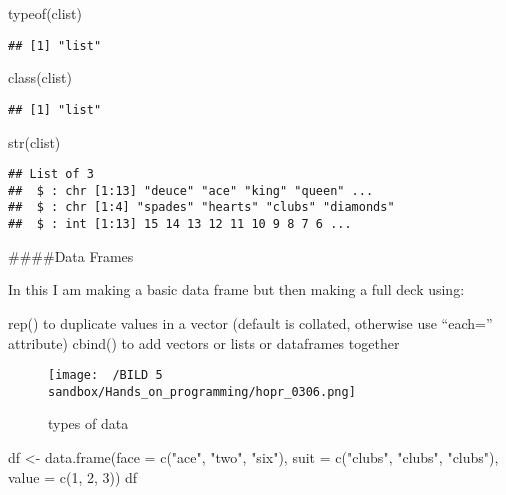 \documentclass[
]{article}
\newenvironment{Shaded}{\begin{snugshade}}{\end{snugshade}}
\newcommand{\AttributeTok}[1]{\textcolor[rgb]{0.77,0.63,0.00}{#1}}
\newcommand{\DecValTok}[1]{\textcolor[rgb]{0.00,0.00,0.81}{#1}}
\newcommand{\FunctionTok}[1]{\textcolor[rgb]{0.00,0.00,0.00}{#1}}
\newcommand{\NormalTok}[1]{#1}
\newcommand{\OtherTok}[1]{\textcolor[rgb]{0.56,0.35,0.01}{#1}}
\newcommand{\StringTok}[1]{\textcolor[rgb]{0.31,0.60,0.02}{#1}}
\begin{document}
\begin{Shaded}
\begin{Highlighting}[]
\FunctionTok{typeof}\NormalTok{(clist)}
\end{Highlighting}
\end{Shaded}

\begin{verbatim}
## [1] "list"
\end{verbatim}

\begin{Shaded}
\begin{Highlighting}[]
\FunctionTok{class}\NormalTok{(clist)}
\end{Highlighting}
\end{Shaded}

\begin{verbatim}
## [1] "list"
\end{verbatim}

\begin{Shaded}
\begin{Highlighting}[]
\FunctionTok{str}\NormalTok{(clist)}
\end{Highlighting}
\end{Shaded}

\begin{verbatim}
## List of 3
##  $ : chr [1:13] "deuce" "ace" "king" "queen" ...
##  $ : chr [1:4] "spades" "hearts" "clubs" "diamonds"
##  $ : int [1:13] 15 14 13 12 11 10 9 8 7 6 ...
\end{verbatim}

\#\#\#\#Data Frames

In this I am making a basic data frame but then making a full deck
using:

rep() to duplicate values in a vector (default is collated, otherwise
use ``each='' attribute) cbind() to add vectors or lists or dataframes
together

\begin{figure}
\centering
\texttt{[image: ~/BILD 5 sandbox/Hands\_on\_programming/hopr\_0306.png]}
\caption{types of data}
\end{figure}

\begin{Shaded}
\begin{Highlighting}[]
\NormalTok{df }\OtherTok{\textless{}{-}} \FunctionTok{data.frame}\NormalTok{(}\AttributeTok{face =} \FunctionTok{c}\NormalTok{(}\StringTok{"ace"}\NormalTok{, }\StringTok{"two"}\NormalTok{, }\StringTok{"six"}\NormalTok{),  }
  \AttributeTok{suit =} \FunctionTok{c}\NormalTok{(}\StringTok{"clubs"}\NormalTok{, }\StringTok{"clubs"}\NormalTok{, }\StringTok{"clubs"}\NormalTok{), }\AttributeTok{value =} \FunctionTok{c}\NormalTok{(}\DecValTok{1}\NormalTok{, }\DecValTok{2}\NormalTok{, }\DecValTok{3}\NormalTok{))}
\NormalTok{df}
\end{Highlighting}
\end{Shaded}
\end{document}
